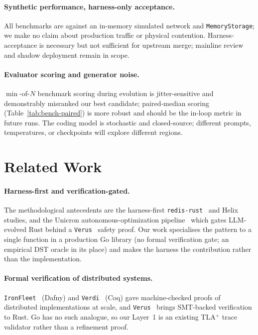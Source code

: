 \documentclass{article}
\begin{document}
\paragraph{Synthetic performance, harness-only acceptance.}
All benchmarks are against an in-memory simulated network and
\texttt{MemoryStorage}; we make no claim about production traffic or
physical contention. Harness-acceptance is necessary but not
sufficient for upstream merge; mainline review and shadow deployment
remain in scope.

\paragraph{Evaluator scoring and generator noise.}
$\min$-of-$N$ benchmark scoring during evolution is jitter-sensitive
and demonstrably misranked our best candidate; paired-median scoring
(Table~\ref{tab:bench-paired}) is more robust and should be the in-loop
metric in future runs. The coding model is stochastic and closed-source;
different prompts, temperatures, or checkpoints will explore different
regions.

\section{Related Work}
\label{sec:related}

\paragraph{Harness-first and verification-gated.}
The methodological antecedents are the harness-first
\texttt{redis-rust}~\cite{redisRust} and Helix~\cite{datadogHarness}
studies, and the Unicron autonomous-optimization
pipeline~\cite{datadogAutonomous} which gates LLM-evolved Rust
behind a \texttt{Verus}~\cite{verus} safety proof. Our work
specialises the pattern to a single function in a production Go
library (no formal verification gate; an empirical DST oracle in its
place) and makes the harness the contribution rather than the
implementation.

\paragraph{Formal verification of distributed systems.}
\texttt{IronFleet}~\cite{ironfleet} (Dafny) and
\texttt{Verdi}~\cite{verdi} (Coq) gave machine-checked proofs of
distributed implementations at scale, and \texttt{Verus}~\cite{verus}
brings SMT-backed verification to Rust. Go has no such analogue, so
our Layer~1 is an existing TLA$^{+}$ trace validator rather than a
refinement proof.
\end{document}
